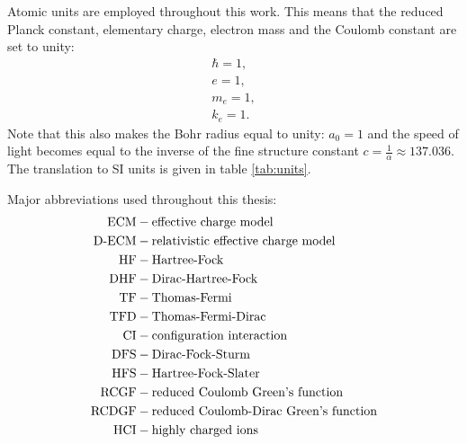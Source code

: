 Atomic units are employed throughout this work. This means that the reduced Planck constant, elementary charge, electron mass and the Coulomb constant are set to unity:
\begin{align*}
    \hbar = 1,\\
    e = 1,\\
    m_e = 1, \\
    k_e = 1.
\end{align*}
Note that this also makes the Bohr radius equal to unity: $a_0=1$ and the speed of light becomes equal to the inverse of the fine structure constant $c= \frac{1}{\alpha} \approx 137.036$. The translation to SI units is given in table \ref{tab:units}. 

Major abbreviations used throughout this thesis:
\begin{align*}
   \rm{ECM} &- \text{effective charge model}\\
   \rm{D}\text{-}\rm{ECM} &- \text{relativistic effective charge model} \\
    \rm{HF} &- \text{Hartree-Fock}\\
    \rm{DHF} &- \text{Dirac-Hartree-Fock}\\
    \rm{TF} &- \text{Thomas-Fermi} \\
    \rm{TFD} &- \text{Thomas-Fermi-Dirac} \\
    \rm{CI} &- \text{configuration interaction} \\
    \rm{DFS} &- \text{Dirac-Fock-Sturm} \\
    \rm{HFS} &- \text{Hartree-Fock-Slater} \\
    \rm{RCGF} &- \text{reduced Coulomb Green's function} \\
    \rm{RCDGF} &- \text{reduced Coulomb-Dirac Green's function} \\
    \rm{HCI} &- \text{highly charged ions}
\end{align*}

